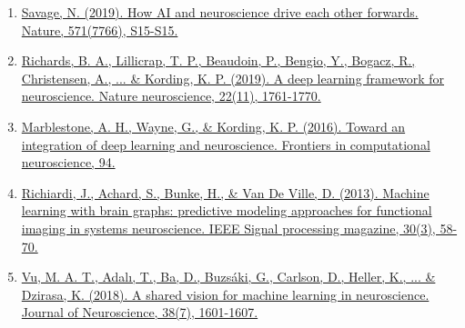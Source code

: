 \documentclass{article}
\begin{document}
\begin{enumerate}
\item \href{https://www.nature.com/articles/d41586-019-02212-4 }{Savage, N. (2019). How AI and neuroscience drive each other forwards. Nature, 571(7766), S15-S15.} \cite{savage2019ai}
\item \href{https://www.nature.com/articles/s41593-019-0520-2}{Richards, B. A., Lillicrap, T. P., Beaudoin, P., Bengio, Y., Bogacz, R., Christensen, A., ... \& Kording, K. P. (2019). A deep learning framework for neuroscience. Nature neuroscience, 22(11), 1761-1770.} \cite{richards2019deep}
\item \href{https://www.frontiersin.org/articles/10.3389/fncom.2016.00094/pdf}{Marblestone, A. H., Wayne, G., \& Kording, K. P. (2016). Toward an integration of deep learning and neuroscience. Frontiers in computational neuroscience, 94.} \cite{marblestone2016toward}
\item \href{https://archive-ouverte.unige.ch/unige:33936/ATTACHMENT01}{Richiardi, J., Achard, S., Bunke, H., \& Van De Ville, D. (2013). Machine learning with brain graphs: predictive modeling approaches for functional imaging in systems neuroscience. IEEE Signal processing magazine, 30(3), 58-70.} \cite{richiardi2013machine}  
\item \href{https://www.jneurosci.org/content/jneuro/38/7/1601.full.pdf}{Vu, M. A. T., Adalı, T., Ba, D., Buzsáki, G., Carlson, D., Heller, K., ... \& Dzirasa, K. (2018). A shared vision for machine learning in neuroscience. Journal of Neuroscience, 38(7), 1601-1607.} \cite{vu2018shared}
\end{enumerate}
\end{document}
